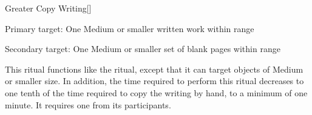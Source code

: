 \lowercase{\hypertarget{spell:Greater Copy Writing}{}}\label{spell:Greater Copy Writing}
\begin{freeability}[Rank 4]{\hypertarget{spell:Greater Copy Writing}{Greater Copy Writing}}[]

Primary target: One Medium or smaller written work within \rngclose range
\par\noindent
Secondary target: One Medium or smaller set of blank pages within \rngclose range

This ritual functions like the  ritual, except that it can target objects of Medium or smaller size.
In addition, the time required to perform this ritual decreases to one tenth of the time required to copy the writing by hand, to a minimum of one minute.
It requires one  from its participants.

\end{freeability}
\vspace{0.25em}


